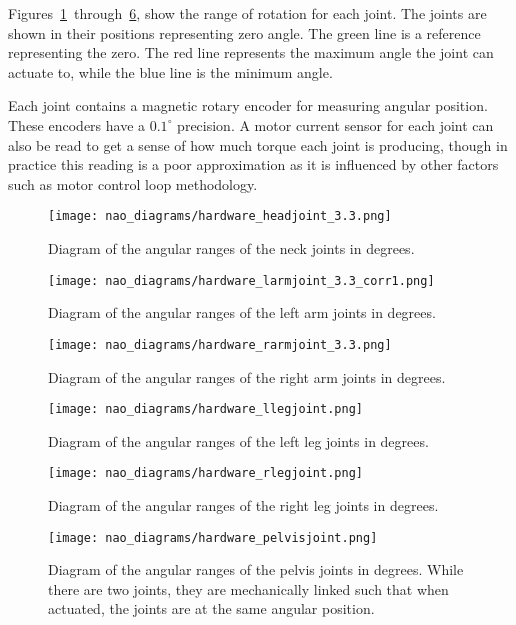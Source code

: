 Figures~\ref{fig:nao_neck_joints1}~through~\ref{fig:nao_hip_yawpitch1},
show the range of rotation for each joint. The joints are shown in their positions
representing zero angle. The green line is a reference representing the zero.
The red line represents the maximum angle the joint can actuate to, while the
blue line is the minimum angle.

Each joint contains a magnetic rotary encoder for measuring angular position.
These encoders have a $0.1^\circ$ precision. A motor current sensor for each
joint can also be read to get a sense of how much torque each joint is
producing, though in practice this reading is a poor approximation as it is
influenced by other factors such as motor control loop methodology.

\begin{figure}
\centering
\texttt{[image: nao\_diagrams/hardware\_headjoint\_3.3.png]}
\caption{Diagram of the angular ranges of the neck joints in degrees.}
\label{fig:nao_neck_joints1}
\end{figure}

\begin{figure}
\centering
\texttt{[image: nao\_diagrams/hardware\_larmjoint\_3.3\_corr1.png]}
\caption{Diagram of the angular ranges of the left arm joints in degrees.}
\label{fig:nao_arm_joints_left1}
\end{figure}

\begin{figure}
\centering
\texttt{[image: nao\_diagrams/hardware\_rarmjoint\_3.3.png]}
\caption{Diagram of the angular ranges of the right arm joints in degrees.}
\label{fig:nao_arm_joints_right1}
\end{figure}

\begin{figure}
\centering
\texttt{[image: nao\_diagrams/hardware\_llegjoint.png]}
\caption{Diagram of the angular ranges of the left leg joints in degrees.}
\label{fig:nao_leg_joints_left1}
\end{figure}

\begin{figure}
\centering
\texttt{[image: nao\_diagrams/hardware\_rlegjoint.png]}
\caption{Diagram of the angular ranges of the right leg joints in degrees.}
\label{fig:nao_leg_joints_right1}
\end{figure}

\begin{figure}
\centering
\texttt{[image: nao\_diagrams/hardware\_pelvisjoint.png]}
\caption{Diagram of the angular ranges of the pelvis joints in degrees.
         While there are two joints, they are mechanically linked such that
         when actuated, the joints are at the same angular position.}
\label{fig:nao_hip_yawpitch1}
\end{figure}

